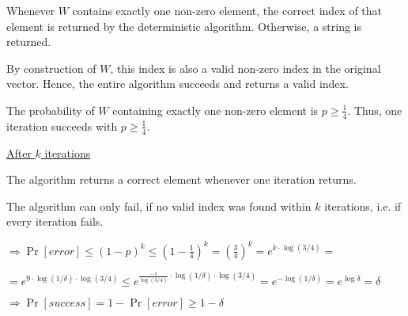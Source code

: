 \begin{itemize}
    Whenever $W$ contains exactly one non-zero element, the correct index of that element is returned by the deterministic algorithm. Otherwise, a string is returned.
    
    By construction of $W$, this index is also a valid non-zero index in the original vector. Hence, the entire algorithm succeeds and returns a valid index.
    
    The probability of $W$ containing exactly one non-zero element is $p \geq \frac{1}{4}$. Thus, one iteration succeeds with $p \geq \frac{1}{4}$.
    
    \underline{After $k$ iterations}
    
    The algorithm returns a correct element whenever one iteration returns.
    
    The algorithm can only fail, if no valid index was found within $k$ iterations, i.e. if every iteration fails.
    
    $\Rightarrow \Pr[\textit{error}] \leq 
    (1 - p)^k \leq 
    \left(1 - \frac{1}{4}\right)^k = 
    \left(\frac{3}{4}\right)^k = 
    e^{k \cdot \log(3/4)} = $
    
    $ = e^{9 \cdot \log(1/\delta) \cdot \log(3/4)} \leq
    e^{\frac{- 1}{\log(3/4)} \cdot \log(1/\delta) \cdot \log(3/4)} = 
    e^{-\log(1/\delta)} = 
    e^{\log \delta} =
    \delta$
    
    $\Rightarrow \Pr[\textit{success}] = 1 - \Pr[\textit{error}] \geq 1 - \delta$
    
\end{itemize}

